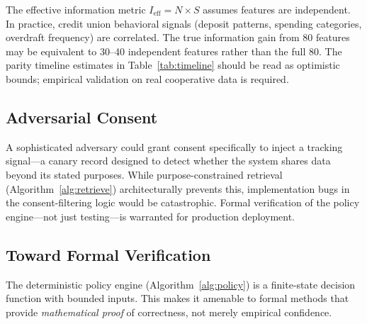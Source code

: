 \documentclass[11pt,twocolumn]{article}
\begin{document}
The effective information metric $I_{\text{eff}} = N \times S$ assumes features are independent. In practice, credit union behavioral signals (deposit patterns, spending categories, overdraft frequency) are correlated. The true information gain from 80 features may be equivalent to 30--40 independent features rather than the full 80. The parity timeline estimates in Table~\ref{tab:timeline} should be read as optimistic bounds; empirical validation on real cooperative data is required.

\subsection{Adversarial Consent}

A sophisticated adversary could grant consent specifically to inject a tracking signal---a canary record designed to detect whether the system shares data beyond its stated purposes. While purpose-constrained retrieval (Algorithm~\ref{alg:retrieve}) architecturally prevents this, implementation bugs in the consent-filtering logic would be catastrophic. Formal verification of the policy engine---not just testing---is warranted for production deployment.

\subsection{Toward Formal Verification}

The deterministic policy engine (Algorithm~\ref{alg:policy}) is a finite-state decision function with bounded inputs. This makes it amenable to formal methods that provide \emph{mathematical proof} of correctness, not merely empirical confidence.
\end{document}
